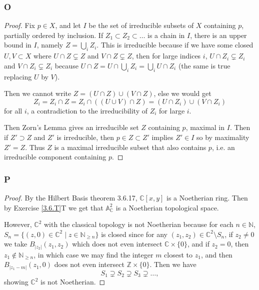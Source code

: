 \documentclass{article}
\newcommand{\A}{\mathbb{A}}
\newcommand{\N}{\mathbb{N}}
\newcommand{\Z}{\mathbb{Z}}
\newcommand{\C}{\mathbb{C}}
\begin{document}
\subsubsection{O}\label{3.6.O}
\begin{proof}
    Fix $p\in X$, and let $I$ be the set of irreducible subsets of $X$ containing $p$, partially ordered by inclusion. If $Z_1\subset Z_2 \subset \dots$ is a chain in $I$, there is an upper bound in $I$, namely $Z=\bigcup_i Z_i$. This is irreducible because if we have some closed $U,V\subset X$ where $U\cap Z\subsetneq Z$ and $V\cap Z\subsetneq Z$, then for large indices $i$, $U\cap Z_i \subsetneq Z_i$ and $V\cap Z_i \subsetneq Z_i$ because $U\cap Z = U\cap \bigcup_i Z_i = \bigcup_i U\cap Z_i$ (the same is true replacing $U$ by $V$). 
    
    Then we cannot write $Z=(U\cap Z) \cup (V\cap Z)$, else we would get
    \[
    Z_i=Z_i \cap Z = Z_i \cap ((U\cup V)\cap Z)=(U\cap Z_i)\cup (V\cap Z_i)
    \]
    for all $i$, a contradiction to the irreducibility of $Z_i$ for large $i$.

    Then Zorn's Lemma gives an irreducible set $Z$ containing $p$, maximal in $I$. Then if $Z'\supset Z$ and $Z'$ is irreducible, then $p\in Z\subset Z'$ implies $Z'\in I$ so by maximality $Z'=Z$. Thus $Z$ is a maximal irreducible subset that also contains $p$, i.e. an irreducible component containing $p$.
\end{proof}
\subsubsection{P}\label{3.6.P}
\begin{proof}
    By the Hilbert Basis theorem 3.6.17, $\C[x,y]$ is a Noetherian ring. Then by Exercise \ref{3.6.T}T
    we get that $\A^2_\C$ is a Noetherian topological space.

    However, $\C^2$ with the classical topology is not Noetherian because for each $n\in \N$, $S_n=\{ (z,0)\in \C^2\mid z\in \N_{\ge n}\}$ is closed since for any $(z_1,z_2)\in \C^2\setminus S_n$, if $z_2\ne 0$ we take $B_{|z_2|}(z_1,z_2)$ which does not even intersect $\C\times \{0\}$, and if $z_2=0$, then $z_1\notin \N_{\ge n}$, in which case we may find the integer $m$ closest to $z_1$, and then $B_{|z_1-m|}(z_1,0)$ does not even intersect $\Z \times \{0\}$. Then we have $$S_1\supsetneq S_2\supsetneq S_3 \supsetneq \dots,$$showing $\C^2$ is not Noetherian.
\end{proof}
\end{document}
